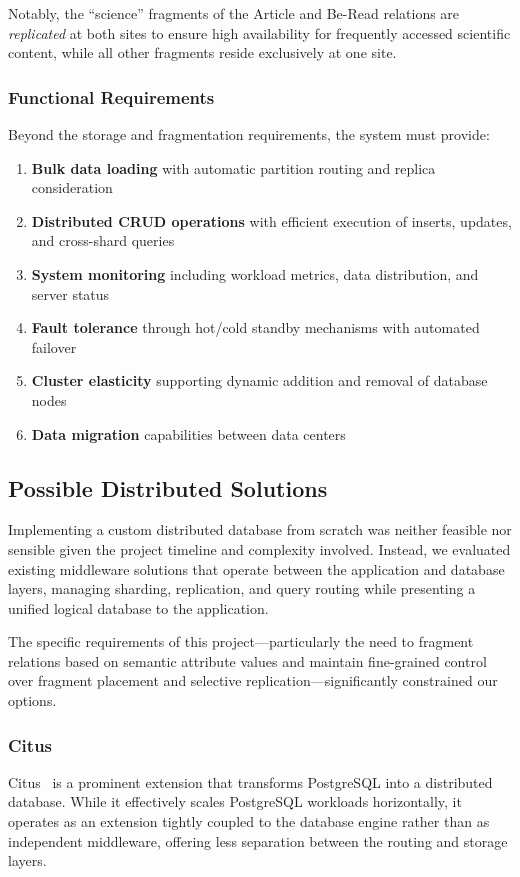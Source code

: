 \documentclass{article}
\begin{document}
Notably, the ``science'' fragments of the Article and Be-Read relations are \emph{replicated} at both sites to ensure high availability for frequently accessed scientific content, while all other fragments reside exclusively at one site.

\subsubsection{Functional Requirements}
Beyond the storage and fragmentation requirements, the system must provide:
\begin{enumerate}
    \item \textbf{Bulk data loading} with automatic partition routing and replica consideration
    \item \textbf{Distributed CRUD operations} with efficient execution of inserts, updates, and cross-shard queries
    \item \textbf{System monitoring} including workload metrics, data distribution, and server status
    \item \textbf{Fault tolerance} through hot/cold standby mechanisms with automated failover
    \item \textbf{Cluster elasticity} supporting dynamic addition and removal of database nodes
    \item \textbf{Data migration} capabilities between data centers
\end{enumerate}

\subsection{Possible Distributed Solutions}
Implementing a custom distributed database from scratch was neither feasible nor sensible given the project timeline and complexity involved. Instead, we evaluated existing middleware solutions that operate between the application and database layers, managing sharding, replication, and query routing while presenting a unified logical database to the application.

The specific requirements of this project---particularly the need to fragment relations based on semantic attribute values and maintain fine-grained control over fragment placement and selective replication---significantly constrained our options.

\subsubsection{Citus}
Citus~\citep{citus} is a prominent extension that transforms PostgreSQL into a distributed database. While it effectively scales PostgreSQL workloads horizontally, it operates as an extension tightly coupled to the database engine rather than as independent middleware, offering less separation between the routing and storage layers.
\end{document}
